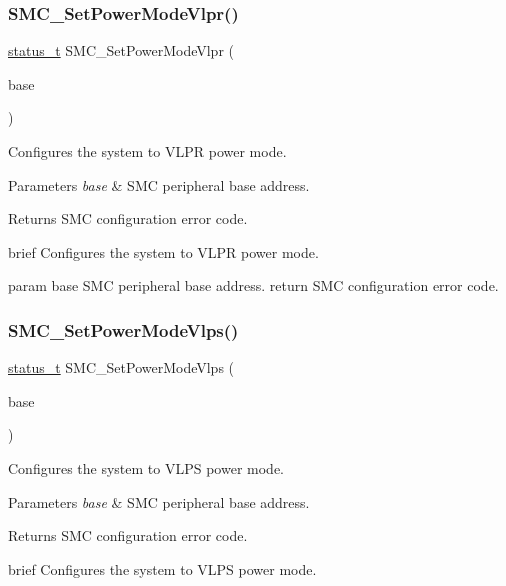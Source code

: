 \subsubsection{\texorpdfstring{SMC\_SetPowerModeVlpr()}{SMC\_SetPowerModeVlpr()}}
{\footnotesize\ttfamily \mbox{\hyperlink{group__ksdk__common_gaaabdaf7ee58ca7269bd4bf24efcde092}{status\+\_\+t}} S\+M\+C\+\_\+\+Set\+Power\+Mode\+Vlpr (\begin{DoxyParamCaption}\item[{\mbox{\hyperlink{struct_s_m_c___type}{S\+M\+C\+\_\+\+Type}} $\ast$}]{base }\end{DoxyParamCaption})}



Configures the system to V\+L\+PR power mode. 


\begin{DoxyParams}{Parameters}
{\em base} & S\+MC peripheral base address. \\
\hline
\end{DoxyParams}
\begin{DoxyReturn}{Returns}
S\+MC configuration error code.
\end{DoxyReturn}
brief Configures the system to V\+L\+PR power mode.

param base S\+MC peripheral base address. return S\+MC configuration error code. \mbox{\label{group__smc_ga7f7303f155f36716cc68672e0a4027cf}} 
\subsubsection{\texorpdfstring{SMC\_SetPowerModeVlps()}{SMC\_SetPowerModeVlps()}}
{\footnotesize\ttfamily \mbox{\hyperlink{group__ksdk__common_gaaabdaf7ee58ca7269bd4bf24efcde092}{status\+\_\+t}} S\+M\+C\+\_\+\+Set\+Power\+Mode\+Vlps (\begin{DoxyParamCaption}\item[{\mbox{\hyperlink{struct_s_m_c___type}{S\+M\+C\+\_\+\+Type}} $\ast$}]{base }\end{DoxyParamCaption})}



Configures the system to V\+L\+PS power mode. 


\begin{DoxyParams}{Parameters}
{\em base} & S\+MC peripheral base address. \\
\hline
\end{DoxyParams}
\begin{DoxyReturn}{Returns}
S\+MC configuration error code.
\end{DoxyReturn}
brief Configures the system to V\+L\+PS power mode.


